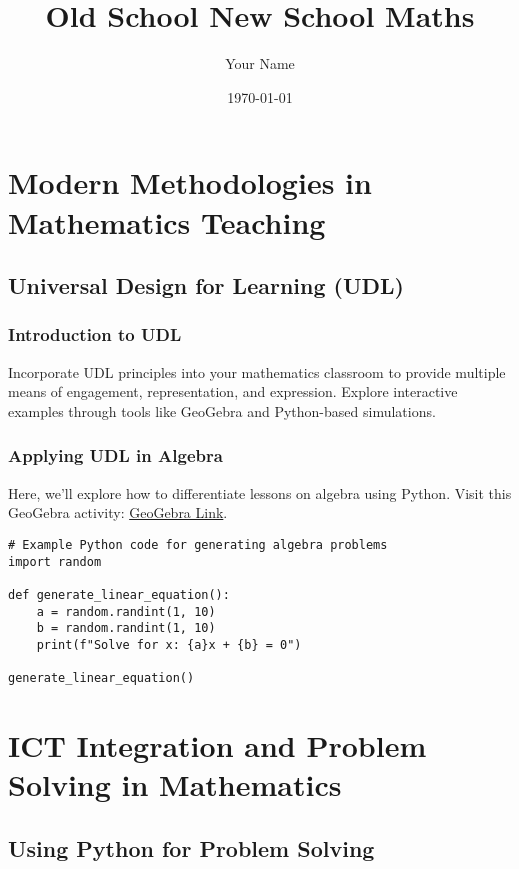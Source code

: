\documentclass[12pt, a4paper]{memoir}
\title{Old School New School Maths}
\author{Your Name}
\date{\today}
\begin{document}
\frontmatter
\maketitle
\tableofcontents

\mainmatter

\part{Modern Methodologies in Mathematics Teaching}

\chapter{Universal Design for Learning (UDL)}
\section{Introduction to UDL}
Incorporate UDL principles into your mathematics classroom to provide multiple means of engagement, representation, and expression. Explore interactive examples through tools like GeoGebra and Python-based simulations.

\section{Applying UDL in Algebra}
Here, we'll explore how to differentiate lessons on algebra using Python. Visit this GeoGebra activity: \href{https://www.geogebra.org/classic}{GeoGebra Link}.

\begin{verbatim}
# Example Python code for generating algebra problems
import random

def generate_linear_equation():
    a = random.randint(1, 10)
    b = random.randint(1, 10)
    print(f"Solve for x: {a}x + {b} = 0")

generate_linear_equation()
\end{verbatim}

\part{ICT Integration and Problem Solving in Mathematics}

\chapter{Using Python for Problem Solving}
\end{document}
